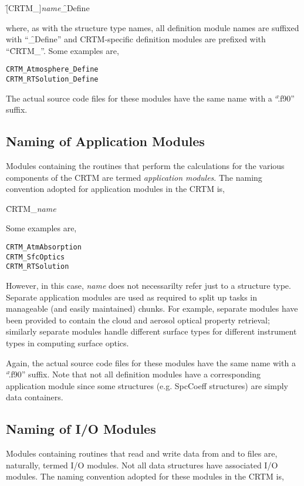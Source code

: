 \hspace{0.5cm}\f{[CRTM\_]}\textit{name}\f{\_Define} 

where, as with the structure type names, all definition module names are suffixed with ``\f{\_Define}'' and CRTM-specific definition modules are prefixed with ``\f{CRTM\_}''. Some examples are,
\begin{alltt}
  CRTM_Atmosphere_Define
  CRTM_RTSolution_Define\end{alltt}
The actual source code files for these modules have the same name with a ``\f{.f90}'' suffix.


\subsection{Naming of Application Modules}
Modules containing the routines that perform the calculations for the various components of the CRTM are termed \textit{application modules}. The naming convention adopted for application modules in the CRTM is, 

\hspace{0.5cm}\f{CRTM\_}\textit{name}

Some examples are,
\begin{alltt}
  CRTM_AtmAbsorption
  CRTM_SfcOptics
  CRTM_RTSolution\end{alltt}
However, in this case, \textit{name} does not necessarilty refer just to a structure type. Separate application modules are used as required to split up tasks in manageable (and easily maintained) chunks. For example, separate modules have been provided to contain the cloud and aerosol optical property retrieval; similarly separate modules handle different surface types for different instrument types in computing surface optics.

Again, the actual source code files for these modules have the same name with a ``\f{.f90}'' suffix. Note that not all definition modules have a corresponding application module since some structures (e.g. SpcCoeff structures) are simply data containers.


\subsection{Naming of I/O Modules}
Modules containing routines that read and write data from and to files are, naturally, termed I/O modules. Not all data structures have associated I/O modules. The naming convention adopted for these modules in the CRTM is, 

